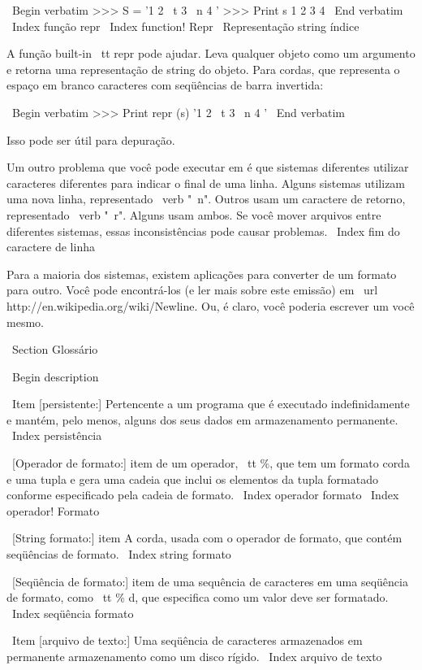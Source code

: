 \documentclass[10pt]{book}
\begin{document}
{{{{{{{{{{{\ Begin {verbatim}
>>> S = '1 2 \ t 3 \ n 4 '
>>> Print s
1 2 3
 4
\ End {verbatim}
\ Index {função repr}
\ Index {function! Repr}
\ {Representação string} índice

A função built-in {\ tt repr} pode ajudar. Leva qualquer objeto como um
argumento e retorna uma representação de string do objeto. Para
cordas, que representa o espaço em branco
caracteres com seqüências de barra invertida:

\ Begin {verbatim}
>>> Print repr (s)
'1 2 \ t 3 \ n 4 '
\ End {verbatim}

Isso pode ser útil para depuração.

Um outro problema que você pode executar em é que sistemas diferentes
utilizar caracteres diferentes para indicar o final de uma linha. Alguns
sistemas utilizam uma nova linha, representado \ verb "\ n". Outros usam
um caractere de retorno, representado \ verb "\ r". Alguns usam ambos.
Se você mover arquivos entre diferentes sistemas, essas inconsistências
pode causar problemas.
\ Index {fim do caractere de linha}

Para a maioria dos sistemas, existem aplicações para converter de um
formato para outro. Você pode encontrá-los (e ler mais sobre este
emissão) em \ url {http://en.wikipedia.org/wiki/Newline}. Ou, é claro, você
poderia escrever um você mesmo.


\ Section {} Glossário

\ Begin {description}

\ Item [persistente:] Pertencente a um programa que é executado indefinidamente
e mantém, pelo menos, alguns dos seus dados em armazenamento permanente.
\ Index {persistência}

\ [Operador de formato:] item de um operador, {\ tt \%}, que tem um formato
corda e uma tupla e gera uma cadeia que inclui
os elementos da tupla formatado conforme especificado pela cadeia de formato.
\ Index {operador formato}
\ Index {operador! Formato}

\ [String formato:] item A corda, usada com o operador de formato, que
contém seqüências de formato.  
\ Index {string formato}

\ [Seqüência de formato:] item de uma sequência de caracteres em uma seqüência de formato,
como {\ tt \% d}, que especifica como um valor deve ser formatado.
\ Index {seqüência formato}

\ Item [arquivo de texto:] Uma seqüência de caracteres armazenados em permanente
armazenamento como um disco rígido.
\ Index {arquivo de texto}

}}}}}}}}}}}
\end{document}
